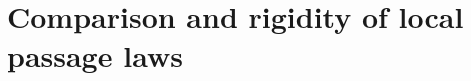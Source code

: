 \section{Comparison and rigidity of local passage laws}
\label{comp:section}\label{common:section}






